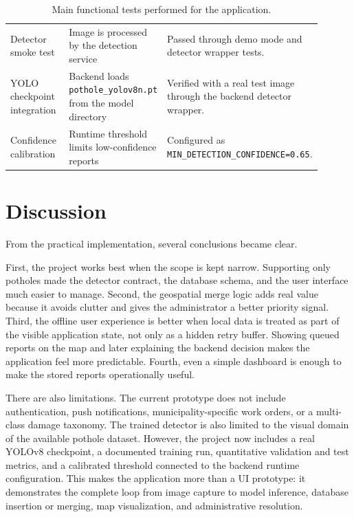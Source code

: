 \begin{table}[htbp]
\begin{tabular}{>{\raggedright\arraybackslash}p{0.24\linewidth} >{\raggedright\arraybackslash}p{0.30\linewidth} >{\raggedright\arraybackslash}p{0.36\linewidth}}
Detector smoke test & Image is processed by the detection service & Passed through demo mode and detector wrapper tests. \\
YOLO checkpoint integration & Backend loads \texttt{pothole\_yolov8n.pt} from the model directory & Verified with a real test image through the backend detector wrapper. \\
Confidence calibration & Runtime threshold limits low-confidence reports & Configured as \texttt{MIN\_DETECTION\_CONFIDENCE=0.65}. \\
\bottomrule
\end{tabular}
\caption{Main functional tests performed for the application.}
\label{tab:functional_tests}
\end{table}

\section{Discussion}

From the practical implementation, several conclusions became clear.

First, the project works best when the scope is kept narrow. Supporting only potholes made the detector contract, the database schema, and the user interface much easier to manage. Second, the geospatial merge logic adds real value because it avoids clutter and gives the administrator a better priority signal. Third, the offline user experience is better when local data is treated as part of the visible application state, not only as a hidden retry buffer. Showing queued reports on the map and later explaining the backend decision makes the application feel more predictable. Fourth, even a simple dashboard is enough to make the stored reports operationally useful.

There are also limitations. The current prototype does not include authentication, push notifications, municipality-specific work orders, or a multi-class damage taxonomy. The trained detector is also limited to the visual domain of the available pothole dataset. However, the project now includes a real YOLOv8 checkpoint, a documented training run, quantitative validation and test metrics, and a calibrated threshold connected to the backend runtime configuration. This makes the application more than a UI prototype: it demonstrates the complete loop from image capture to model inference, database insertion or merging, map visualization, and administrative resolution.
